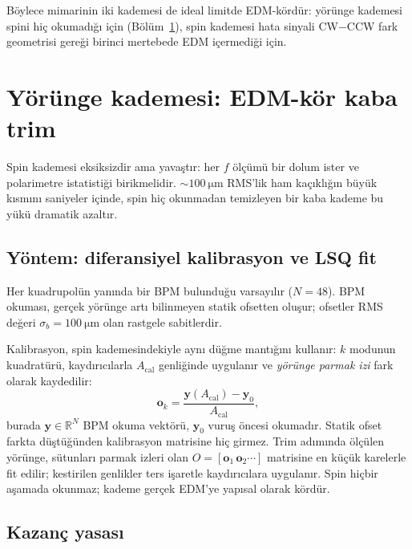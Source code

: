 \documentclass[preprint,12pt]{elsarticle}
\begin{document}
Böylece mimarinin iki kademesi de ideal limitde EDM-kördür: yörünge
kademesi spini hiç okumadığı için (Bölüm~\ref{sec:orbit-trim}), spin
kademesi hata sinyali CW$-$CCW fark geometrisi gereği birinci mertebede
EDM içermediği için.

\section{Yörünge kademesi: EDM-kör kaba trim}
\label{sec:orbit-trim}

Spin kademesi eksiksizdir ama yavaştır: her $f$ ölçümü bir dolum ister
ve polarimetre istatistiği birikmelidir. $\sim\SI{100}{\micro\meter}$
RMS'lik ham kaçıklığın büyük kısmını saniyeler içinde, spin hiç
okunmadan temizleyen bir kaba kademe bu yükü dramatik azaltır.

\subsection{Yöntem: diferansiyel kalibrasyon ve LSQ fit}
\label{sec:orbit-yontem}

Her kuadrupolün yanında bir BPM bulunduğu varsayılır ($N=48$). BPM
okuması, gerçek yörünge artı bilinmeyen statik ofsetten oluşur;
ofsetler RMS değeri $\sigma_b=\SI{100}{\micro\meter}$ olan rastgele
sabitlerdir.

Kalibrasyon, spin kademesindekiyle aynı düğme mantığını kullanır:
$k$ modunun kuadratürü, kaydırıcılarla $A_\mathrm{cal}$ genliğinde
uygulanır ve \emph{yörünge parmak izi} fark olarak kaydedilir:
\begin{equation}
\mathbf{o}_k=\frac{\mathbf{y}(A_\mathrm{cal})-\mathbf{y}_0}
{A_\mathrm{cal}},
\label{eq:parmak-izi}
\end{equation}
burada $\mathbf{y}\in\mathbb{R}^{N}$ BPM okuma vektörü,
$\mathbf{y}_0$ vuruş öncesi okumadır. Statik ofset farkta düştüğünden
kalibrasyon matrisine hiç girmez. Trim adımında ölçülen yörünge,
sütunları parmak izleri olan $O=[\mathbf{o}_1\,\mathbf{o}_2\cdots]$
matrisine en küçük karelerle fit edilir; kestirilen genlikler ters
işaretle kaydırıcılara uygulanır. Spin hiçbir aşamada okunmaz; kademe
gerçek EDM'ye yapısal olarak kördür.

\subsection{Kazanç yasası}
\label{sec:kazanc}
\end{document}
